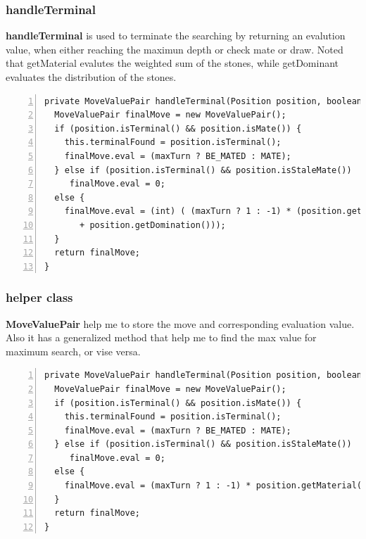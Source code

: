 \documentclass{article}
\begin{document}
\subsubsection{handleTerminal}

\textbf{handleTerminal} is used to terminate the searching by returning an evalution value, when either reaching the maximun depth or check mate or draw. Noted that getMaterial evalutes the weighted sum of the stones, while getDominant evaluates the distribution of the stones.

\begin{lstlisting}[numbers=left]
private MoveValuePair handleTerminal(Position position, boolean maxTurn) {
  MoveValuePair finalMove = new MoveValuePair();
  if (position.isTerminal() && position.isMate()) {
    this.terminalFound = position.isTerminal();
    finalMove.eval = (maxTurn ? BE_MATED : MATE);
  } else if (position.isTerminal() && position.isStaleMate())
     finalMove.eval = 0;
  else {
    finalMove.eval = (int) ( (maxTurn ? 1 : -1) * (position.getMaterial() 
       + position.getDomination()));
  }
  return finalMove;
}
\end{lstlisting}

\subsubsection{helper class}

\textbf{MoveValuePair} help me to store the move and corresponding evaluation value. Also it has a generalized method that help me to find the max value for maximum search, or vise versa.

\begin{lstlisting}[numbers=left]
private MoveValuePair handleTerminal(Position position, boolean maxTurn) {
  MoveValuePair finalMove = new MoveValuePair();
  if (position.isTerminal() && position.isMate()) {
    this.terminalFound = position.isTerminal();
    finalMove.eval = (maxTurn ? BE_MATED : MATE);
  } else if (position.isTerminal() && position.isStaleMate())
     finalMove.eval = 0;
  else {
    finalMove.eval = (maxTurn ? 1 : -1) * position.getMaterial();
  }
  return finalMove;
}
\end{lstlisting}
\end{document}
